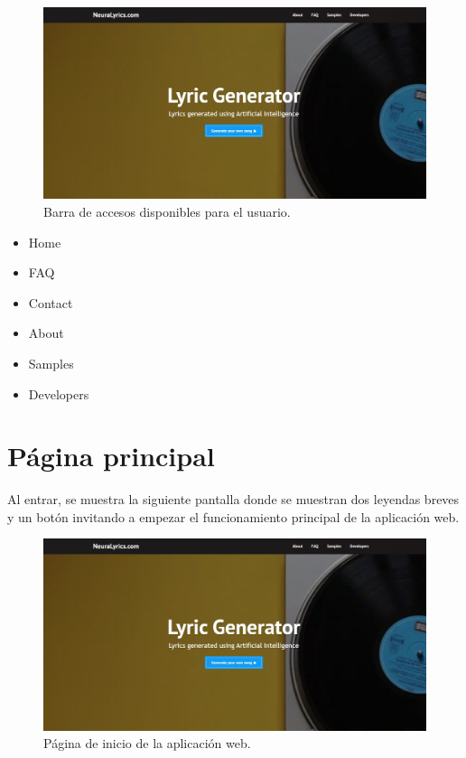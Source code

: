 \documentclass[12pt, a4paper, titlepage]{article}
\begin{document}
	\begin{figure}[H]
		\includegraphics[width=13.5cm]{./Imagenes/Capturas/pprincipal.jpg}
		\centering \caption{Barra de accesos disponibles para el usuario.}
	\end{figure}
	\begin{itemize}
		\item Home
		\item FAQ
		\item Contact
		\item About
		\item Samples
		\item Developers
	\end{itemize}
	\newpage
	\section{Página principal}
	Al entrar, se muestra la siguiente pantalla donde se muestran dos leyendas breves y un botón invitando a empezar el funcionamiento principal de la aplicación web.
	\begin{figure}[H] 
		\includegraphics[width=13.5cm]{./Imagenes/Capturas/pprincipal.jpg}
		\centering \caption{Página de inicio de la aplicación web.}
	\end{figure}
\end{document}
